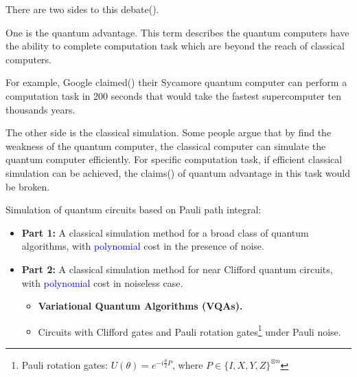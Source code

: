 \documentclass[10pt]{beamer}
\begin{document}
\begin{CJK}{UTF8}{gbsn}
{There are two sides to this debate().

One is the quantum advantage.
This term describes the quantum computers have the ability to complete computation task which are beyond the reach of classical computers.

For example, Google claimed() their Sycamore quantum computer can perform a computation task in 200 seconds that would take the fastest supercomputer ten thousands years.

The other side is the classical simulation.
Some people argue that by find the weakness of the quantum computer, the classical computer can simulate the quantum computer efficiently.
For specific computation task, if efficient classical simulation can be achieved, the claims() of quantum advantage in this task would be broken.






}

\begin{frame}[fragile]
  Simulation of quantum circuits based on Pauli path integral:
  \begin{itemize}
    \item \textbf{Part 1:} A classical simulation method for a broad class of quantum algorithms, 
    with \textcolor{blue}{polynomial} cost in the presence of noise.
    \item \textbf{Part 2:} A classical simulation method for near Clifford quantum circuits,
    with \textcolor{blue}{polynomial} cost in noiseless case.
    \begin{itemize}
      \item \textbf{Variational Quantum Algorithms (VQAs).}
      \item Circuits with Clifford gates and Pauli rotation gates\footnote{Pauli rotation gates: $U(\theta)=e^{-i\frac{\theta}{2}P}$, where $P\in\{I,X,Y,Z\}^{\otimes n}$} under Pauli noise.
    \end{itemize}
  \end{itemize}
\end{frame}
\end{CJK}
\end{document}
